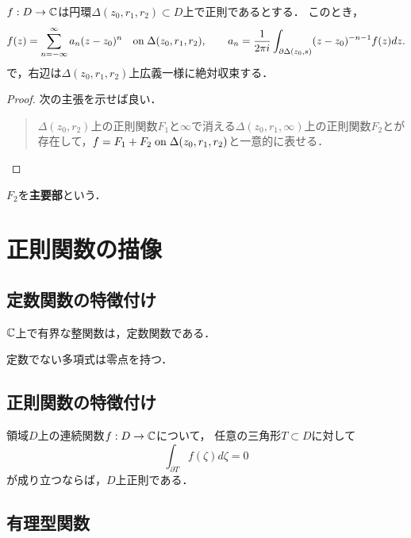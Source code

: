 \documentclass[uplatex, dvipdfmx]{jsreport}
\begin{document}
\begin{theorem}
    $f:D\to\mathbb{C}$は円環$\Delta(z_0,r_1,r_2)\subset D$上で正則であるとする．
    このとき，
    \[f(z)=\sum^\infty_{n=-\infty}a_n(z-z_0)^n\quad\mathrm{on}\;\Delta(z_0,r_1,r_2),\qquad a_n=\frac{1}{2\pi i}\int_{\partial\Delta(z_0,s)}(z-z_0)^{-n-1}f(z)dz.\]
    で，右辺は$\Delta(z_0,r_1,r_2)$上広義一様に絶対収束する．
\end{theorem}
\begin{proof}
    次の主張を示せば良い．
    \begin{quote}
        $\Delta(z_0,r_2)$上の正則関数$F_1$と$\infty$で消える$\Delta(z_0,r_1,\infty)$上の正則関数$F_2$とが存在して，$f=F_1+F_2\;\mathrm{on}\;\Delta(z_0,r_1,r_2)$と一意的に表せる．
    \end{quote}
\end{proof}

\begin{definition}
    $F_2$を\textbf{主要部}という．
\end{definition}

\section{正則関数の描像}

\subsection{定数関数の特徴付け}

\begin{corollary}[Liouville]
    $\mathbb{C}$上で有界な整関数は，定数関数である．
\end{corollary}

\begin{corollary}[代数学の基本定理]
    定数でない多項式は零点を持つ．
\end{corollary}

\subsection{正則関数の特徴付け}

\begin{corollary}[Morera]
    領域$D$上の連続関数$f:D\to\mathbb{C}$について，
    任意の三角形$T\subset D$に対して
    \[\int_{\partial T}f(\zeta)d\zeta=0\]
    が成り立つならば，$D$上正則である．
\end{corollary}

\subsection{有理型関数}
\end{document}
